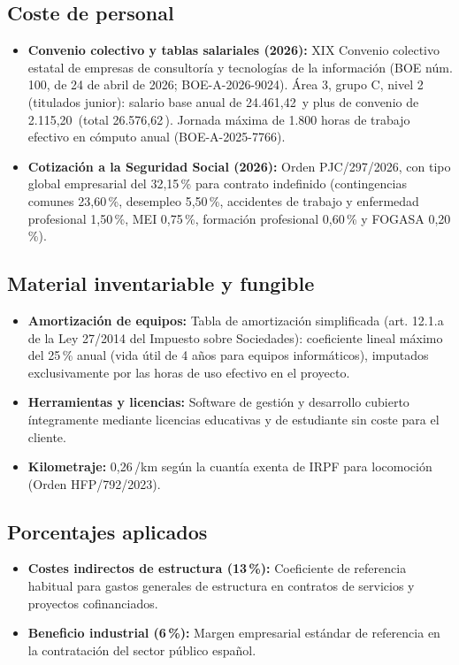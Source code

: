 \documentclass[a4paper,10pt]{article}
\newcommand{\eu}{\,\texteuro}
\begin{document}
\subsection{Coste de personal}
\begin{itemize}[leftmargin=1.2em, itemsep=3pt, topsep=3pt]
  \item \textbf{Convenio colectivo y tablas salariales (2026):} XIX Convenio colectivo estatal de empresas de consultoría y tecnologías de la información (BOE núm. 100, de 24 de abril de 2026; BOE-A-2026-9024). Área 3, grupo C, nivel 2 (titulados junior): salario base anual de 24.461,42\eu{} y plus de convenio de 2.115,20\eu{} (total 26.576,62\eu). Jornada máxima de 1.800 horas de trabajo efectivo en cómputo anual (BOE-A-2025-7766).
  \item \textbf{Cotización a la Seguridad Social (2026):} Orden PJC/297/2026, con tipo global empresarial del 32,15\,\% para contrato indefinido (contingencias comunes 23,60\,\%, desempleo 5,50\,\%, accidentes de trabajo y enfermedad profesional 1,50\,\%, MEI 0,75\,\%, formación profesional 0,60\,\% y FOGASA 0,20\,\%).
\end{itemize}

\subsection{Material inventariable y fungible}
\begin{itemize}[leftmargin=1.2em, itemsep=3pt, topsep=3pt]
  \item \textbf{Amortización de equipos:} Tabla de amortización simplificada (art. 12.1.a de la Ley 27/2014 del Impuesto sobre Sociedades): coeficiente lineal máximo del 25\,\% anual (vida útil de 4 años para equipos informáticos), imputados exclusivamente por las horas de uso efectivo en el proyecto.
  \item \textbf{Herramientas y licencias:} Software de gestión y desarrollo cubierto íntegramente mediante licencias educativas y de estudiante sin coste para el cliente.
  \item \textbf{Kilometraje:} 0,26\eu/km según la cuantía exenta de IRPF para locomoción (Orden HFP/792/2023).
\end{itemize}

\subsection{Porcentajes aplicados}
\begin{itemize}[leftmargin=1.2em, itemsep=3pt, topsep=3pt]
  \item \textbf{Costes indirectos de estructura (13\,\%):} Coeficiente de referencia habitual para gastos generales de estructura en contratos de servicios y proyectos cofinanciados.
  \item \textbf{Beneficio industrial (6\,\%):} Margen empresarial estándar de referencia en la contratación del sector público español.
\end{itemize}
\end{document}
